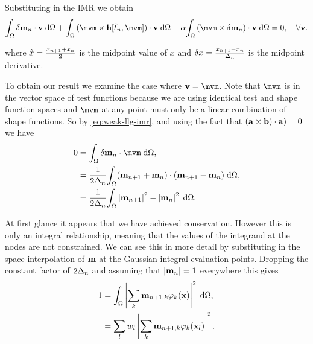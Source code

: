 
Substituting in the IMR we obtain
\begin{equation}
  \label{eq:weak-llg-imr}
  \ipg{\dmdtm}{\testv} + \ipg{(\mvm \times \hv[\tm, \mvm])}{\testv} - \dampc \ipg{(\mvm \times \dmdtm)}{\testv} = 0, \quad \forall \testv .
\end{equation}

where $\hat{x} = \frac{x_{n+1} + x_{n}}{2}$ is the midpoint value of $x$ and $\delta x = \frac{x_{n+1} - x_n}{\Delta_{n}}$ is the midpoint derivative.

To obtain our result we examine the case where $\testv = \mvm$.
Note that $\mvm$ is in the vector space of test functions because we are using identical test and shape function spaces and $\mvm$ at any point must only be a linear combination of shape functions.
So by \ref{eq:weak-llg-imr}, and using the fact that $({\mathbf{a}} \times {\mathbf{b}}) \cdot {\mathbf{a}}) = 0$ we have
\begin{equation}
\label{eq:23}
  \begin{aligned}
    0 &= \ipg{\dmdtm}{\mvm}, \\
    &= \frac{1}{2\dtn} \intd{(\mv_{n+1} + \mv_{n}) \cdot (\mv_{n+1} - \mv_n)}, \\
    &= \frac{1}{2\dtn} \intd{\abs{\mv_{n+1}}^2 - \abs{\mv_{n}}^2}.
  \end{aligned}
\end{equation}

At first glance it appears that we have achieved conservation. However this is only an integral relationship, meaning that the values of the integrand at the nodes are not constrained.
We can see this in more detail by substituting in the space interpolation of $\mathbf{m}$ at the Gaussian integral evaluation points.
Dropping the constant factor of $2\Delta_{n}$ and assuming that $\left|{\mathbf{m}_n} \right| = 1$ everywhere this gives
\begin{equation}
  \begin{aligned} 
    1 &= {\int_{\Omega} \left|{\sum_k \mathbf{m}_{n+1, k} \varphi_k(\mathbf{x})} \right|^2 {\; \text{d}} {\Omega}}, \\
    &= \sum_l w_l \left|{\sum_k \mathbf{m}_{n+1, k} \varphi_k(\mathbf{x}_l)} \right|^2.
  \end{aligned} 
\end{equation}

